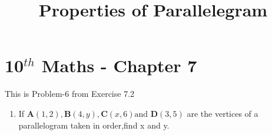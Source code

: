 \documentclass[12pt]{article}
\let\vec\mathbf
\begin{document}
\begin{center}
\title{\textbf{Properties of Parallelegram}}
\date{\vspace{-5ex}} %
\maketitle
\end{center}

\setcounter{page}{1}

\section{10$^{th}$ Maths - Chapter 7}

This is Problem-6 from Exercise 7.2

\begin{enumerate}
\item If $\vec{A}(1, 2),\vec{B}(4, y),\vec{C}(x, 6) \text{and } \vec{D}(3, 5)$ are the vertices of a parallelogram taken in order,find x and y.
\end{enumerate}
\end{document}

